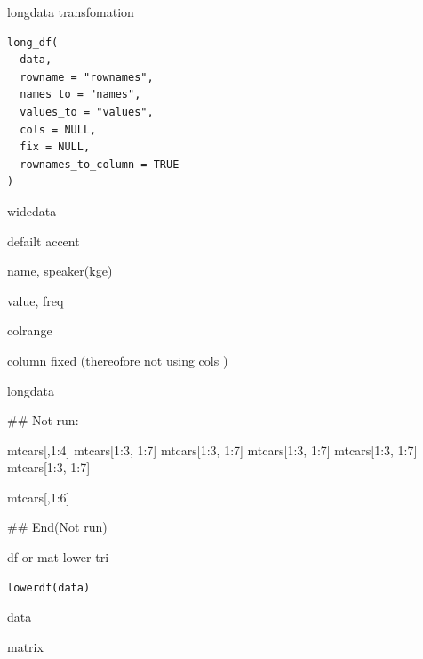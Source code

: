 \documentclass[a4paper]{book}
\begin{document}
%
\begin{Description}
longdata transfomation
\end{Description}
%
\begin{Usage}
\begin{verbatim}
long_df(
  data,
  rowname = "rownames",
  names_to = "names",
  values_to = "values",
  cols = NULL,
  fix = NULL,
  rownames_to_column = TRUE
)
\end{verbatim}
\end{Usage}
%
\begin{Arguments}
\begin{ldescription}
\item[\code{data}] widedata

\item[\code{rowname}] defailt accent

\item[\code{names\_to}] name, speaker(kge)

\item[\code{values\_to}] value, freq

\item[\code{cols}] colrange

\item[\code{fix}] column fixed (thereofore not using cols )
\end{ldescription}
\end{Arguments}
%
\begin{Value}
longdata
\end{Value}
%
\begin{Examples}
\begin{ExampleCode}
\#\# Not run: 

mtcars[,1:4] %
mtcars[1:3, 1:7] %
mtcars[1:3, 1:7] %
mtcars[1:3, 1:7] %
mtcars[1:3, 1:7] %
mtcars[1:3, 1:7] %


 mtcars[,1:6] %




## End(Not run)
\end{ExampleCode}
\end{Examples}

%
\begin{Description}
df or mat lower tri
\end{Description}
%
\begin{Usage}
\begin{verbatim}
lowerdf(data)
\end{verbatim}
\end{Usage}
%
\begin{Arguments}
\begin{ldescription}
\item[\code{data}] data
\end{ldescription}
\end{Arguments}
%
\begin{Value}
matrix
\end{Value}
\end{document}
